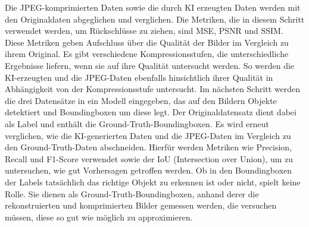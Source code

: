     Die JPEG-komprimierten Daten sowie die durch KI erzeugten Daten werden mit den Originaldaten abgeglichen und verglichen. Die Metriken, die in diesem Schritt verwendet werden, um Rückschlüsse zu ziehen, sind MSE, PSNR und SSIM.
    Diese Metriken geben Aufschluss über die Qualität der Bilder im Vergleich zu ihrem Original.
    Es gibt verschiedene Kompressionsstufen, die unterschiedliche Ergebnisse liefern, wenn sie auf ihre Qualität untersucht werden. So werden die KI-erzeugten und die JPEG-Daten ebenfalls hinsichtlich ihrer Qualität in Abhängigkeit von der Kompressionsstufe untersucht.
    Im nächsten Schritt werden die drei Datensätze in ein Modell eingegeben, das auf den Bildern Objekte detektiert und Boundingboxen um diese legt. Der Originaldatensatz dient dabei als Label und enthält die Ground-Truth-Boundingboxen.
    Es wird erneut verglichen, wie die KI-generierten Daten und die JPEG-Daten im Vergleich zu den Ground-Truth-Daten abschneiden. Hierfür werden Metriken wie Precision, Recall und F1-Score verwendet sowie der IoU (Intersection over Union), um zu untersuchen, wie gut Vorhersagen getroffen werden. 
    Ob in den Boundingboxen der Labels tatsächlich das richtige Objekt zu erkennen ist oder nicht, spielt keine Rolle. Sie dienen als Ground-Truth-Boundingboxen, anhand derer die rekonstruierten und komprimierten Bilder gemessen werden, die versuchen müssen, diese so gut wie möglich zu approximieren.
